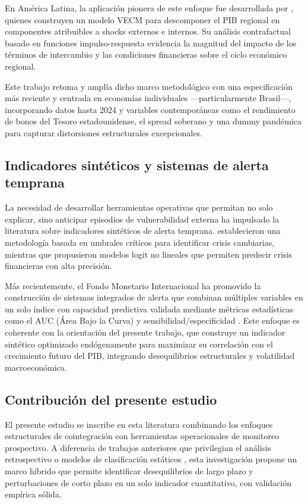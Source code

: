 \documentclass[12pt]{article}
\begin{document}
En América Latina, la aplicación pionera de este enfoque fue desarrollada por \cite{izquierdo2008}, quienes construyen un modelo VECM para descomponer el PIB regional en componentes atribuibles a shocks externos e internos. Su análisis contrafactual basado en funciones impulso-respuesta evidencia la magnitud del impacto de los términos de intercambio y las condiciones financieras sobre el ciclo económico regional.

Este trabajo retoma y amplía dicho marco metodológico con una especificación más reciente y centrada en economías individuales —particularmente Brasil—, incorporando datos hasta 2024 y variables contemporáneas como el rendimiento de bonos del Tesoro estadounidense, el spread soberano y una dummy pandémica para capturar distorsiones estructurales excepcionales.

\subsection{Indicadores sintéticos y sistemas de alerta temprana}

La necesidad de desarrollar herramientas operativas que permitan no solo explicar, sino anticipar episodios de vulnerabilidad externa ha impulsado la literatura sobre indicadores sintéticos de alerta temprana. \cite{kaminsky1998} establecieron una metodología basada en umbrales críticos para identificar crisis cambiarias, mientras que \cite{bussiere2006} propusieron modelos logit no lineales que permiten predecir crisis financieras con alta precisión.

Más recientemente, el Fondo Monetario Internacional ha promovido la construcción de sistemas integrados de alerta que combinan múltiples variables en un solo índice con capacidad predictiva validada mediante métricas estadísticas como el AUC (Área Bajo la Curva) y sensibilidad/especificidad \cite{balakrishnan2011}. Este enfoque es coherente con la orientación del presente trabajo, que construye un indicador sintético optimizado endógenamente para maximizar su correlación con el crecimiento futuro del PIB, integrando desequilibrios estructurales y volatilidad macroeconómica.

\subsection{Contribución del presente estudio}

El presente estudio se inscribe en esta literatura combinando los enfoques estructurales de cointegración con herramientas operacionales de monitoreo prospectivo. A diferencia de trabajos anteriores que privilegian el análisis retrospectivo \cite{izquierdo2008} o modelos de clasificación estáticos \cite{kaminsky1998}, esta investigación propone un marco híbrido que permite identificar desequilibrios de largo plazo y perturbaciones de corto plazo en un solo indicador cuantitativo, con validación empírica sólida.
\end{document}
